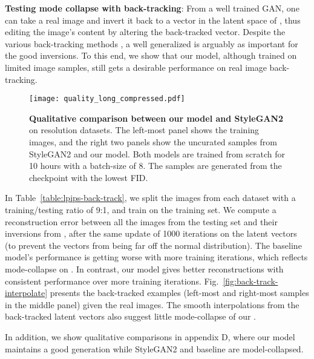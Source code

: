 \documentclass{article} \usepackage{iclr2021_conference,times}
\begin{document}
\textbf{Testing mode collapse with back-tracking}: From a well trained GAN, one can take a real image and invert it back to a vector in the latent space of , thus editing the image's content by altering the back-tracked vector. Despite the various back-tracking methods \citep{zhu2016generative,lipton2017precise,zhu2020domain,abdal2019image2stylegan}, a well generalized  is arguably as important for the good inversions. 
To this end, we show that our model, although trained on limited image samples, still gets a desirable performance on real image back-tracking.

\begin{figure}
\begin{center}
\texttt{[image: quality\_long\_compressed.pdf]}
\end{center}
\caption{\textbf{Qualitative comparison between our model and StyleGAN2} on  resolution datasets. The left-most panel shows the training images, and the right two panels show the uncurated samples from StyleGAN2 and our model. Both models are trained from scratch for 10 hours with a batch-size of 8. The samples are generated from the checkpoint with the lowest FID. }
\label{fig:quality-compare}
\end{figure}

In Table~\ref{table:lpips-back-track}, we split the images from each dataset with a training/testing ratio of 9:1, and train  on the training set. We compute a reconstruction error between all the images from the testing set and their inversions from , after the same update of 1000 iterations on the latent vectors (to prevent the vectors from being far off the normal distribution). The baseline model's performance is getting worse with more training iterations, which reflects mode-collapse on . In contrast, our model gives better reconstructions with consistent performance over more training iterations. Fig.~\ref{fig:back-track-interpolate} presents the back-tracked examples (left-most and right-most samples in the middle panel) given the real images. The smooth interpolations from the back-tracked latent vectors also suggest little mode-collapse of our  \citep{radford2015unsupervised,zhao2020differentiable,robb2020few}.

In addition, we show qualitative comparisons in appendix D, where our model maintains a good generation while StyleGAN2 and baseline are model-collapsed.
\end{document}

